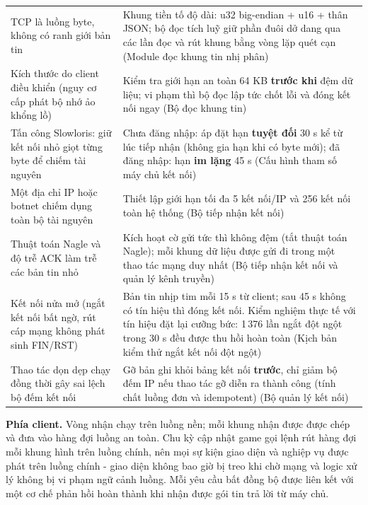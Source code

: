 \begin{center}\small
\begin{tabularx}{\linewidth}{|L{4.6cm}|Y|}
\hline
{} &  \\ \hline
TCP là luồng byte, không có ranh giới bản tin & Khung tiền tố độ dài:  u32 big-endian +  u16 + thân JSON; bộ đọc tích luỹ giữ phần đuôi dở dang qua các lần đọc và rút khung bằng vòng lặp quét cạn (Module đọc khung tin nhị phân) \\ \hline
Kích thước  do client điều khiển (nguy cơ cấp phát bộ nhớ ảo khổng lồ) & Kiểm tra giới hạn an toàn 64 KB \textbf{trước khi} đệm dữ liệu; vi phạm thì bộ đọc lập tức chốt lỗi và đóng kết nối ngay (Bộ đọc khung tin) \\ \hline
Tấn công Slowloris: giữ kết nối nhỏ giọt từng byte để chiếm tài nguyên & Chưa đăng nhập: áp đặt hạn \textbf{tuyệt đối} 30 s kể từ lúc tiếp nhận (không gia hạn khi có byte mới); đã đăng nhập: hạn \textbf{im lặng} 45 s (Cấu hình tham số máy chủ kết nối) \\ \hline
Một địa chỉ IP hoặc botnet chiếm dụng toàn bộ tài nguyên & Thiết lập giới hạn tối đa 5 kết nối/IP và 256 kết nối toàn hệ thống (Bộ tiếp nhận kết nối) \\ \hline
Thuật toán Nagle và độ trễ ACK làm trễ các bản tin nhỏ & Kích hoạt cờ gửi tức thì không đệm (tắt thuật toán Nagle); mỗi khung dữ liệu được gửi đi trong một thao tác mạng duy nhất (Bộ tiếp nhận kết nối và quản lý kênh truyền) \\ \hline
Kết nối nửa mở (ngắt kết nối bất ngờ, rút cáp mạng không phát sinh FIN/RST) & Bản tin nhịp tim mỗi 15 s từ client; sau 45 s không có tín hiệu thì đóng kết nối. Kiểm nghiệm thực tế với tín hiệu đặt lại cưỡng bức: 1\,376 lần ngắt đột ngột trong 30 s đều được thu hồi hoàn toàn (Kịch bản kiểm thử ngắt kết nối đột ngột) \\ \hline
Thao tác dọn dẹp chạy đồng thời gây sai lệch bộ đếm kết nối & Gỡ bản ghi khỏi bảng kết nối \textbf{trước}, chỉ giảm bộ đếm IP nếu thao tác gỡ diễn ra thành công (tính chất luồng đơn và idempotent) (Bộ quản lý kết nối) \\ \hline
\end{tabularx}
\end{center}

\textbf{Phía client.} Vòng nhận chạy trên luồng nền; mỗi khung nhận được được chép và đưa vào hàng đợi luồng an toàn. Chu kỳ cập nhật game gọi lệnh rút hàng đợi mỗi khung hình trên luồng chính, nên mọi sự kiện giao diện và nghiệp vụ được phát trên luồng chính - giao diện không bao giờ bị treo khi chờ mạng và logic xử lý không bị vi phạm ngữ cảnh luồng. Mỗi yêu cầu bất đồng bộ được liên kết với một cơ chế phản hồi hoàn thành khi nhận được gói tin trả lời từ máy chủ.

